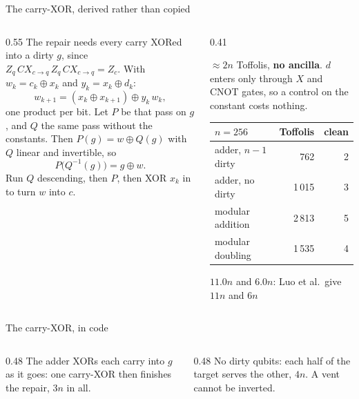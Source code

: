 \documentclass[aspectratio=169,11pt]{beamer}
\newcommand{\code}[2][]{}
\begin{document}
\begin{frame}{The carry-XOR, derived rather than copied}
  \begin{columns}[T]
    \begin{column}{0.55\textwidth}
      \small The repair needs every carry XORed into a dirty $g$, since $Z_q\,CX_{c\to q}\,Z_q\,CX_{c\to q}=Z_c$. With $w_k=c_k\oplus x_k$ and $y_k=x_k\oplus d_k$:
      \[ w_{k+1}=(x_k\oplus x_{k+1})\oplus y_k\,w_k , \]
      one product per bit. Let $P$ be that pass on $g$, and $Q$ the same pass without the constants. Then $P(g)=w\oplus Q(g)$ with $Q$ linear and invertible, so
      \[ P\big(Q^{-1}(g)\big)=g\oplus w . \]
      Run $Q$ descending, then $P$, then XOR $x_k$ in to turn $w$ into $c$.
    \end{column}
    \begin{column}{0.41\textwidth}
      \begin{greyblock}[fontupper=\small]
        $\approx2n$ Toffolis, \textbf{no ancilla}. $d$ enters only through $X$ and CNOT gates, so a control on the constant costs nothing.
      \end{greyblock}
      \vskip1mm
      \centering\footnotesize
      \renewcommand{\arraystretch}{1.08}
      \begin{tabular}{@{}lrr@{}}
        \toprule
        $n=256$ & Toffolis & clean \\
        \midrule
        adder, $n-1$ dirty & 762 & 2 \\
        adder, no dirty & 1\,015 & 3 \\
        modular addition & 2\,813 & 5 \\
        modular doubling & 1\,535 & 4 \\
        \bottomrule
      \end{tabular}\par
      {\scriptsize $11.0n$ and $6.0n$: Luo et al.\ give $11n$ and $6n$}
    \end{column}
  \end{columns}
\end{frame}

\begin{frame}[fragile]{The carry-XOR, in code}
  \code[basicstyle=\ttfamily\scriptsize]{carry_xor.py}
  \vskip1mm
  \begin{columns}[T]
    \begin{column}{0.48\textwidth}
      {\small The adder XORs each carry into $g$ as it goes: one carry-XOR then finishes the repair, $3n$ in all.}
    \end{column}
    \begin{column}{0.48\textwidth}
      {\small No dirty qubits: each half of the target serves the other, $4n$. A vent cannot be inverted.}
    \end{column}
  \end{columns}
\end{frame}
\end{document}
